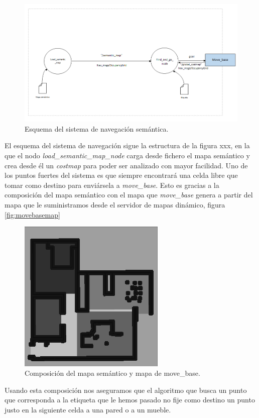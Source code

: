 \begin{figure} [hbtp]
  \begin{center}
    \includegraphics[width=18cm]{img/cap6/esquemasemantic}
  \end{center}
  \caption{Esquema del sistema de navegación semántica.}
  \label{fig:esquemasemantic}
\end{figure}

El esquema del sistema de navegación sigue la estructura de la figura xxx, en la que el nodo \textit{load\_semantic\_map\_node} carga desde fichero el mapa semántico y crea desde él un \textit{costmap} para poder ser analizado con mayor facilidad. 
Uno de los puntos fuertes del sistema es que siempre encontrará una celda libre que tomar como destino para enviársela a 
\textit{move\_base}. Esto es gracias a la composición del mapa semántico con el mapa que \textit{move\_base} genera a partir del mapa que le suministramos desde el servidor de mapas dinámico, figura \ref{fig:movebasemap}

\begin{figure} [H]
  \begin{center}
    \includegraphics[width=7cm]{img/cap6/semanticmapcomp}
  \end{center}
  \caption{Composición del mapa semántico y mapa de move\_base.}
  \label{fig:semanticmapcomp}
\end{figure}

Usando esta composición nos aseguramos que el algoritmo que busca un punto que corresponda a la etiqueta que le hemos pasado no fije como destino un punto justo en la siguiente celda a una pared o a un mueble.